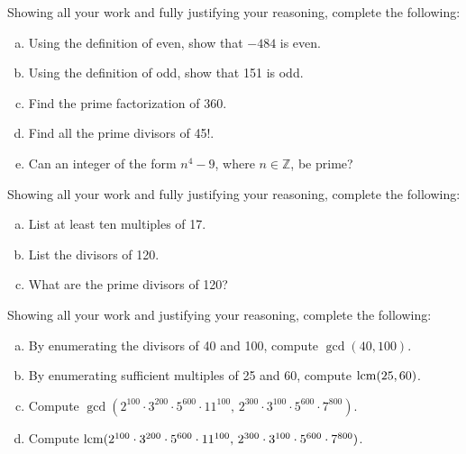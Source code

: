 \documentclass[11pt,letterpaper]{article}
\begin{document}

 Showing all your work and fully justifying your reasoning, complete the following:
	\begin{enumerate}[(a)]
	\item Using the definition of even, show that $-484$ is even.
	\item Using the definition of odd, show that 151 is odd.
	\item Find the prime factorization of 360. 
	\item Find all the prime divisors of 45!. 
	\item Can an integer of the form $n^4 - 9$, where $n \in \mathbb{Z}$, be prime?
	\end{enumerate}



\newpage



 Showing all your work and fully justifying your reasoning, complete the following:
	\begin{enumerate}[(a)]
	\item List at least ten multiples of 17.
	\item List the divisors of 120.
	\item What are the prime divisors of 120?
	\end{enumerate}



\newpage



 Showing all your work and justifying your reasoning, complete the following:
	\begin{enumerate}[(a)]
	\item By enumerating the divisors of 40 and 100, compute $\gcd(40, 100)$.
	\item By enumerating sufficient multiples of 25 and 60, compute $\operatorname{lcm}(25, 60)$.
	\item Compute $\gcd(2^{100} \cdot 3^{200} \cdot 5^{600} \cdot 11^{100},\, 2^{300} \cdot 3^{100} \cdot 5^{600} \cdot 7^{800})$. 
	\item Compute $\operatorname{lcm}(2^{100} \cdot 3^{200} \cdot 5^{600} \cdot 11^{100},\, 2^{300} \cdot 3^{100} \cdot 5^{600} \cdot 7^{800})$. 
	\end{enumerate}
\end{document}
